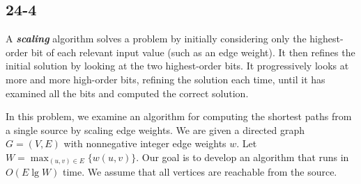 \documentclass{../../class}
\begin{document}
\subsection*{24-4}
A \textbf{\textit{scaling}} algorithm solves a problem by initially considering only the highest-order bit of each relevant input value (such as an edge weight). It then refines the initial solution by looking at the two highest-order bits. It progressively looks at more and more high-order bits, refining the solution each time, until it has examined all the bits and computed the correct solution.

In this problem, we examine an algorithm for computing the shortest paths from a single source by scaling edge weights. We are given a directed graph $G = (V, E)$ with nonnegative integer edge weights $w$. Let $W = \max_{(u, v)\in E}\{w(u, v)\}$. Our goal is to develop an algorithm that runs in $O(E\lg{W})$ time. We assume that all vertices are reachable from the source.
\end{document}
